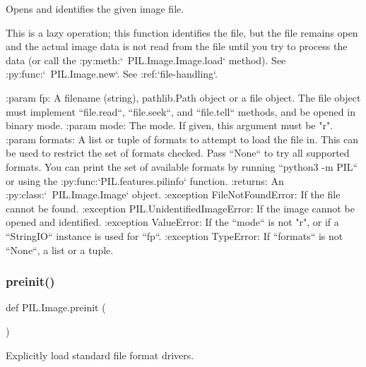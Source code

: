 \begin{DoxyVerb}Opens and identifies the given image file.

This is a lazy operation; this function identifies the file, but
the file remains open and the actual image data is not read from
the file until you try to process the data (or call the
:py:meth:`~PIL.Image.Image.load` method).  See
:py:func:`~PIL.Image.new`. See :ref:`file-handling`.

:param fp: A filename (string), pathlib.Path object or a file object.
   The file object must implement ``file.read``,
   ``file.seek``, and ``file.tell`` methods,
   and be opened in binary mode.
:param mode: The mode.  If given, this argument must be "r".
:param formats: A list or tuple of formats to attempt to load the file in.
   This can be used to restrict the set of formats checked.
   Pass ``None`` to try all supported formats. You can print the set of
   available formats by running ``python3 -m PIL`` or using
   the :py:func:`PIL.features.pilinfo` function.
:returns: An :py:class:`~PIL.Image.Image` object.
:exception FileNotFoundError: If the file cannot be found.
:exception PIL.UnidentifiedImageError: If the image cannot be opened and
   identified.
:exception ValueError: If the ``mode`` is not "r", or if a ``StringIO``
   instance is used for ``fp``.
:exception TypeError: If ``formats`` is not ``None``, a list or a tuple.
\end{DoxyVerb}
 \mbox{\label{namespacePIL_1_1Image_a87bc1e46f66de1ee18167ab66d1871c1}} 
\subsubsection{\texorpdfstring{preinit()}{preinit()}}
{\footnotesize\ttfamily def P\+I\+L.\+Image.\+preinit (\begin{DoxyParamCaption}{ }\end{DoxyParamCaption})}

\begin{DoxyVerb}Explicitly load standard file format drivers.\end{DoxyVerb}
 \mbox{\label{namespacePIL_1_1Image_a963c2d03d760efd61f63c046093e3782}} 
